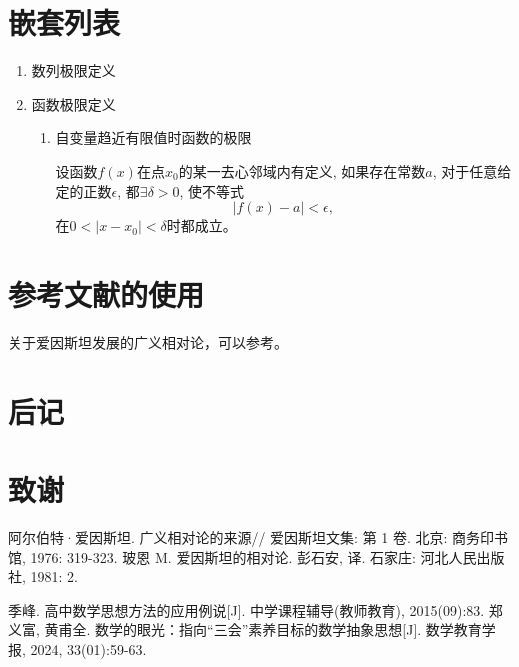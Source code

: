 \documentclass{book}
\begin{document}
\chapter{嵌套列表}
\begin{enumerate}
  \item 数列极限定义
  \item 函数极限定义
    \begin{enumerate}
      \item 自变量趋近有限值时函数的极限

        设函数$𝑓(x)$在点$x_0$的某一去心邻域内有定义, 如果存在常数$a$, 对于任意给定的正数$\epsilon$, 都$\exists\delta>0$, 使不等式
        \[
          \lvert f(x)-a \rvert<\epsilon,
        \]
        在$0<\lvert x-x_0 \rvert<\delta$时都成立。
    \end{enumerate}
\end{enumerate}
\chapter{参考文献的使用}
\nocite{*}
关于爱因斯坦发展的广义相对论，可以参考\cite{born1981}。

 
\backmatter
\appendix
\chapter{后记}
\chapter*{致谢}
%
\begin{thebibliography}{99}
  阿尔伯特·爱因斯坦.
  \newblock 广义相对论的来源\allowbreak[M]//\allowbreak
  \newblock 爱因斯坦文集: 第 1 卷.
  \newblock 北京: 商务印书馆, 1976: 319-323.
  玻恩 M.
  \newblock 爱因斯坦的相对论\allowbreak[M].
  \newblock  彭石安, 译.
  \newblock 石家庄: 河北人民出版社, 1981: 2.

  季峰. 高中数学思想方法的应用例说[J]. 中学课程辅导(教师教育), 2015(09):83.
  郑义富, 黄甫全. 数学的眼光：指向“三会”素养目标的数学抽象思想[J]. 数学教育学报, 2024, 33(01):59-63.

\end{thebibliography}
\end{document}
